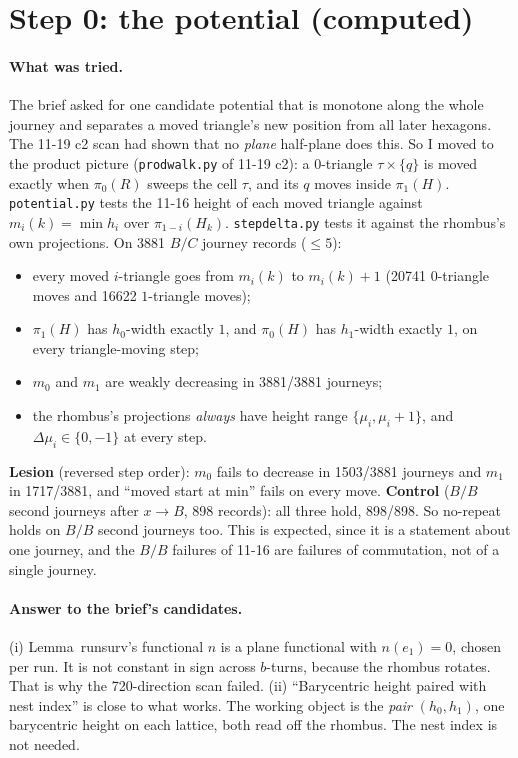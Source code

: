 \documentclass[11pt]{article}
\theoremstyle{definition}\newtheorem{definition}[theorem]{Definition}\newtheorem{remark}[theorem]{Remark}
\begin{document}
\section{Step 0: the potential (computed)}\label{sec:pot}
\paragraph{What was tried.} The brief asked for one candidate potential that is monotone along the whole journey and separates a moved triangle's new position from all later hexagons.
The 11-19 c2 scan had shown that no \emph{plane} half-plane does this. So I moved to the product picture (\texttt{prodwalk.py} of 11-19 c2): a $0$-triangle $\tau\times\{q\}$ is moved exactly when $\pi_0(R)$ sweeps the cell $\tau$, and its $q$ moves inside $\pi_1(H)$.
\texttt{potential.py} tests the 11-16 height of each moved triangle against $m_i(k)=\min h_i$ over $\pi_{1-i}(H_k)$. \texttt{stepdelta.py} tests it against the rhombus's own projections. On 3881 $B/C$ journey records ($\le5$):
\begin{itemize}
\item every moved $i$-triangle goes from $m_i(k)$ to $m_i(k)+1$ (20741 $0$-triangle moves and 16622 $1$-triangle moves);
\item $\pi_1(H)$ has $h_0$-width exactly $1$, and $\pi_0(H)$ has $h_1$-width exactly $1$, on every triangle-moving step;
\item $m_0$ and $m_1$ are weakly decreasing in 3881/3881 journeys;
\item the rhombus's projections \emph{always} have height range $\{\mu_i,\mu_i+1\}$, and $\Delta\mu_i\in\{0,-1\}$ at every step.
\end{itemize}
\textbf{Lesion} (reversed step order): $m_0$ fails to decrease in 1503/3881 journeys and $m_1$ in 1717/3881, and ``moved start at min'' fails on every move. \textbf{Control} ($B/B$ second journeys after $x\to B$, 898 records): all three hold, 898/898.
So no-repeat holds on $B/B$ second journeys too. This is expected, since it is a statement about one journey, and the $B/B$ failures of 11-16 are failures of commutation, not of a single journey.

\paragraph{Answer to the brief's candidates.} (i) Lemma~runsurv's functional $n$ is a plane functional with $n(e_1)=0$, chosen per run. It is not constant in sign across $b$-turns, because the rhombus rotates. That is why the 720-direction scan failed. (ii) ``Barycentric height paired with nest index'' is close to what works. The working object is the \emph{pair} $(h_0,h_1)$, one barycentric height on each lattice, both read off the rhombus. The nest index is not needed.
\end{document}

